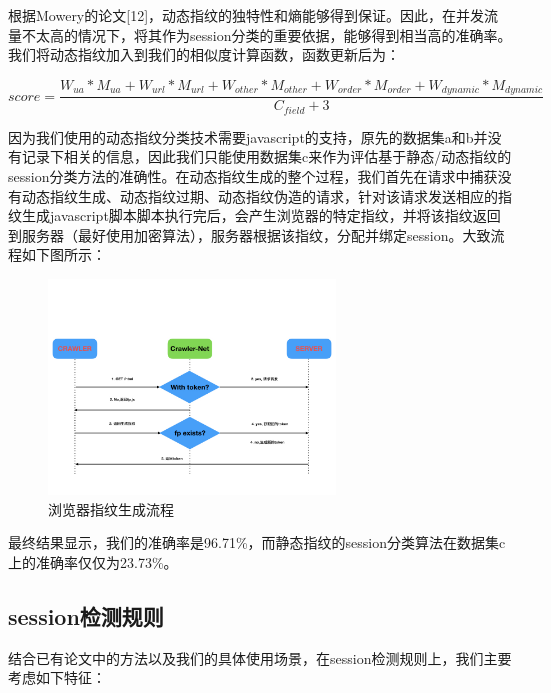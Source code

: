 \documentclass[doctor,privacy,twoside]{buaa_mac}
\begin{document}
根据Mowery的论文[12]，动态指纹的独特性和熵能够得到保证。因此，在并发流量不太高的情况下，将其作为session分类的重要依据，能够得到相当高的准确率。我们将动态指纹加入到我们的相似度计算函数，函数更新后为：

$$score = \frac {W_{ua} * M_{ua} + W_{url} * M_{url} + W_{other} * M_{other} + W_{order} * M_{order} + W_{dynamic} * M_{dynamic}} {C_{field} + 3}$$

因为我们使用的动态指纹分类技术需要javascript的支持，原先的数据集a和b并没有记录下相关的信息，因此我们只能使用数据集c来作为评估基于静态/动态指纹的session分类方法的准确性。在动态指纹生成的整个过程，我们首先在请求中捕获没有动态指纹生成、动态指纹过期、动态指纹伪造的请求，针对该请求发送相应的指纹生成javascript脚本脚本执行完后，会产生浏览器的特定指纹，并将该指纹返回到服务器（最好使用加密算法），服务器根据该指纹，分配并绑定session。大致流程如下图所示：


\centerline{}
\begin{figure}[!h]
  \centering
  \includegraphics[width=0.68\textwidth]{images/fingerprint_generation.jpg}
  \caption{浏览器指纹生成流程}
  \label{fig:logo}
\end{figure}
\centerline{}

最终结果显示，我们的准确率是96.71\%，而静态指纹的session分类算法在数据集c上的准确率仅仅为23.73\%。


\subsection{session检测规则}

结合已有论文中的方法以及我们的具体使用场景，在session检测规则上，我们主要考虑如下特征：
\end{document}
